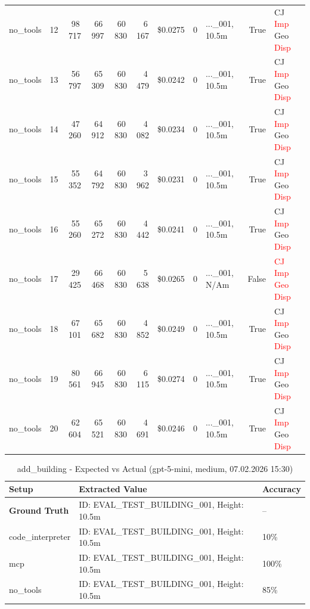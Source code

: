 \documentclass[a4paper,11pt]{article}
\begin{document}
\begin{table}[H]
{\begin{tabular}{l r r r r r r r l r l}
no\_tools & 12 & 98\,717 & 66\,997 & 60\,830 & 6\,167 & \$0.0275 & 0 & ...\_001, 10.5m & True & CJ \textcolor{red}{Imp} Geo \textcolor{red}{Disp} \\
no\_tools & 13 & 56\,797 & 65\,309 & 60\,830 & 4\,479 & \$0.0242 & 0 & ...\_001, 10.5m & True & CJ \textcolor{red}{Imp} Geo \textcolor{red}{Disp} \\
no\_tools & 14 & 47\,260 & 64\,912 & 60\,830 & 4\,082 & \$0.0234 & 0 & ...\_001, 10.5m & True & CJ \textcolor{red}{Imp} Geo \textcolor{red}{Disp} \\
no\_tools & 15 & 55\,352 & 64\,792 & 60\,830 & 3\,962 & \$0.0231 & 0 & ...\_001, 10.5m & True & CJ \textcolor{red}{Imp} Geo \textcolor{red}{Disp} \\
no\_tools & 16 & 55\,260 & 65\,272 & 60\,830 & 4\,442 & \$0.0241 & 0 & ...\_001, 10.5m & True & CJ \textcolor{red}{Imp} Geo \textcolor{red}{Disp} \\
no\_tools & 17 & 29\,425 & 66\,468 & 60\,830 & 5\,638 & \$0.0265 & 0 & ...\_001, N/Am & False & \textcolor{red}{CJ} \textcolor{red}{Imp} \textcolor{red}{Geo} \textcolor{red}{Disp} \\
no\_tools & 18 & 67\,101 & 65\,682 & 60\,830 & 4\,852 & \$0.0249 & 0 & ...\_001, 10.5m & True & CJ \textcolor{red}{Imp} Geo \textcolor{red}{Disp} \\
no\_tools & 19 & 80\,561 & 66\,945 & 60\,830 & 6\,115 & \$0.0274 & 0 & ...\_001, 10.5m & True & CJ \textcolor{red}{Imp} Geo \textcolor{red}{Disp} \\
no\_tools & 20 & 62\,604 & 65\,521 & 60\,830 & 4\,691 & \$0.0246 & 0 & ...\_001, 10.5m & True & CJ \textcolor{red}{Imp} Geo \textcolor{red}{Disp} \\
\bottomrule
\end{tabular}}
\end{table}

\begin{table}[H]
\centering
\scriptsize
\caption{add\_building - Expected vs Actual (gpt-5-mini, medium, 07.02.2026 15:30)}
\begin{tabular}{l l l}
\toprule
Setup & Extracted Value & Accuracy \\
\midrule
\textbf{Ground Truth} & ID: EVAL\_TEST\_BUILDING\_001, Height: 10.5m & -- \\
\midrule
code\_interpreter & ID: EVAL\_TEST\_BUILDING\_001, Height: 10.5m & 10\% \\
mcp & ID: EVAL\_TEST\_BUILDING\_001, Height: 10.5m & 100\% \\
no\_tools & ID: EVAL\_TEST\_BUILDING\_001, Height: 10.5m & 85\% \\
\bottomrule
\end{tabular}
\end{table}

\clearpage
\end{document}
